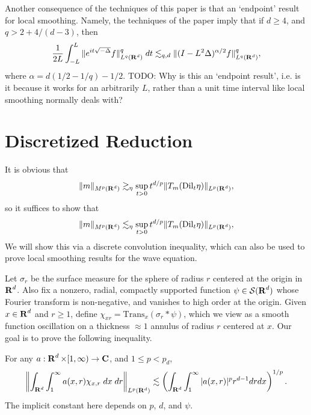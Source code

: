 Another consequence of the techniques of this paper is that an `endpoint' result for local smoothing. Namely, the techniques of the paper imply that if $d \geq 4$, and $q > 2 + 4/(d-3)$, then
%
\[ \frac{1}{2L} \int_{-L}^L \| e^{it \sqrt{-\Delta}} f \|_{L^q(\operatorname{\mathbf{R}}^d)}^q\; dt \lesssim_{q,d} \| (I - L^2 \Delta)^{\alpha/2} f \|_{L^q(\operatorname{\mathbf{R}}^d)}^q, \]
%
where $\alpha = d(1/2 - 1/q) - 1/2$. TODO: Why is this an `endpoint result', i.e. is it because it works for an arbitrarily $L$, rather than a unit time interval like local smoothing normally deals with?

\section{Discretized Reduction}

It is obvious that
%
\[ \| m \|_{M^p(\operatorname{\mathbf{R}}^d)} \gtrsim_\eta \sup_{t > 0} t^{d/p} \| T_m(\text{Dil}_t \eta) \|_{L^p(\operatorname{\mathbf{R}}^d)}, \]
%
so it suffices to show that
%
\[ \| m \|_{M^p(\operatorname{\mathbf{R}}^d)} \lesssim_\eta \sup_{t > 0} t^{d/p} \| T_m(\text{Dil}_t \eta) \|_{L^p(\operatorname{\mathbf{R}}^d)}, \]
%
We will show this via a discrete convolution inequality, which can also be used to prove local smoothing results for the wave equation.

Let $\sigma_r$ be the surface measure for the sphere of radius $r$ centered at the origin in $\operatorname{\mathbf{R}}^d$. Also fix a nonzero, radial, compactly supported function $\psi \in \mathcal{S}(\operatorname{\mathbf{R}}^d)$ whose Fourier transform is non-negative, and vanishes to high order at the origin. Given $x \in \operatorname{\mathbf{R}}^d$ and $r \geq 1$, define $\chi_{x r} = \text{Trans}_x (\sigma_r * \psi)$, which we view as a smooth function oscillation on a thickness $\approx 1$ annulus of radius $r$ centered at $x$. Our goal is to prove the following inequality.

\begin{lemma} \label{lemma1}
    For any $a : \operatorname{\mathbf{R}}^d \times [1,\infty) \to \operatorname{\mathbf{C}}$, and $1 \leq p < p_d$,
    \[ \left\| \int_{\operatorname{\mathbf{R}}^d} \int_1^\infty a(x,r) \chi_{x, r}\; dx\; dr \right\|_{L^p(\operatorname{\mathbf{R}}^d)} \lesssim \left( \int_{\operatorname{\mathbf{R}}^d} \int_1^\infty |a(x,r)|^p r^{d-1} dr dx \right)^{1/p}. \]
    The implicit constant here depends on $p$, $d$, and $\psi$.
\end{lemma}

